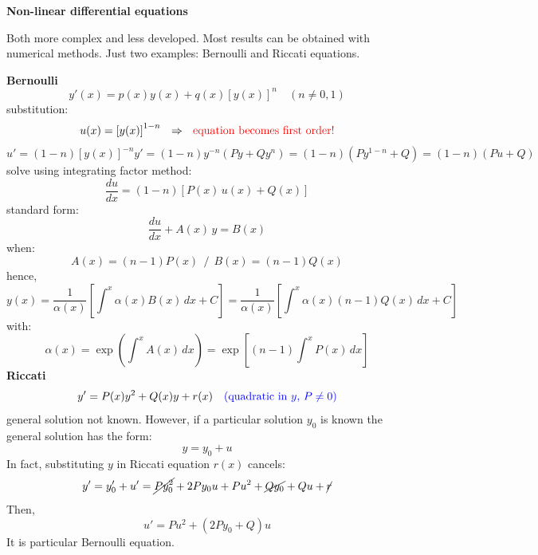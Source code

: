 \documentclass{article}
\begin{document}
\vspace{3mm}\noindent
\textbf{Non-linear differential equations}

\noindent
Both more complex and less developed. Most results can be obtained with numerical methods. Just two examples: Bernoulli and Riccati equations.

\noindent
\textbf{Bernoulli}
\begin{equation}
    y'(x) = p(x) y(x) + q(x) \left[y(x)\right]^n \quad \left(n \neq 0, 1\right)
\end{equation}
substitution:
\begin{equation}
    u(x) = \left[ y(x) \right]^{1 - n}\ \  \Rightarrow  \ \ \color{red}\text{equation becomes first order!} \color{black}
\end{equation}
\begin{equation}
        u' = (1 - n) \left[ y(x) \right]^{-n} y' 
= (1 - n) y^{-n} \left( P y + Q y^n \right) 
= (1 - n) \left( P y^{1 - n} + Q \right) 
= (1 - n) \left( P u + Q \right)
\end{equation}
solve using integrating factor method:
\begin{equation}
\frac{du}{dx} = (1 - n) \left[ P(x)\, u(x) + Q(x) \right]
\end{equation}
standard form:
\begin{equation}
    \frac{du}{dx} + A(x)\, y = B(x)
\end{equation}
when:
\begin{equation}
    A(x) = (n - 1) P(x) \ \ / \ \ B(x) = (n - 1) Q(x)
\end{equation}
hence,
\begin{equation}
    y(x) = \frac{1}{\alpha(x)} \left[ \int^x \alpha(x) B(x) \, dx + C \right]
= \frac{1}{\alpha(x)} \left[ \int^x \alpha(x)(n-1) Q(x) \, dx + C \right]
\end{equation}
with:
\begin{equation}
    \alpha(x) = \exp\left( \int^x A(x)\, dx \right)
= \exp\left[ (n - 1) \int^x P(x)\, dx \right]
\end{equation}
\textbf{Riccati}
\begin{equation}
    y' = P(x) y^2 + Q(x) y + r(x) \quad \color{blue}\text{(quadratic in $y$, $P \neq 0$)} \color{black}
\end{equation}
general solution not known. However, if a particular solution $y_0$ is known the general solution has the form:
\begin{equation}
    y = y_0 + u
\end{equation}
In fact, substituting $y$ in Riccati equation $r(x)$ cancels:
\begin{equation}
    y' = y_0' + u' = \cancel{P y_0^2} + 2P y_0 u + P u^2 + \cancel{Q y_0} + Q u + \cancel{r}
\end{equation}
Then,
\begin{equation}
    u' = P u^2 + \left( 2 P y_0 + Q \right) u
\end{equation}
It is particular Bernoulli equation.
\end{document}
